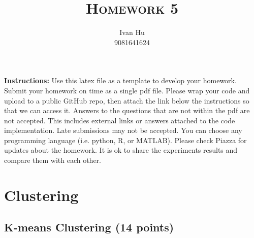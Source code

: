 \documentclass[a4paper]{article}
\title{\textsc{Homework 5}} %
\author{
Ivan Hu \\
9081641624\\
}
\date{}
\theoremstyle{definition}
\begin{document}
\maketitle


\textbf{Instructions:}
Use this latex file as a template to develop your homework. Submit your homework on time as a single pdf file. Please wrap your code and upload to a public GitHub repo, then attach the link below the instructions so that we can access it. Answers to the questions that are not within the pdf are not accepted. This includes external links or answers attached to the code implementation. Late submissions may not be accepted. You can choose any programming language (i.e. python, R, or MATLAB). Please check Piazza for updates about the homework. It is ok to share the experiments results and compare them with each other.

\vspace{0.1in}


\section{Clustering}

\subsection{K-means Clustering (14 points)}
\end{document}
